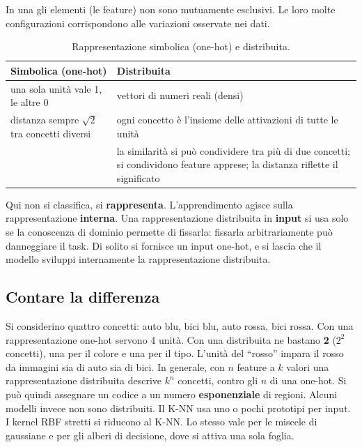 \begin{definizione}
In una  gli elementi (le feature) non sono mutuamente esclusivi. Le loro molte
configurazioni corrispondono alle variazioni osservate nei dati.
\end{definizione}

\begin{table}[ht]
\centering\small
\caption{Rappresentazione simbolica (one-hot) e distribuita.}
\begin{tabularx}{0.95\linewidth}{XX}
\toprule
Simbolica (one-hot) & Distribuita \\
\midrule
una sola unità vale 1, le altre 0 & vettori di numeri reali (densi) \\
distanza sempre $\sqrt2$ tra concetti diversi & ogni concetto è l'insieme delle attivazioni di tutte le unità \\
 & la similarità si può condividere tra più di due concetti; si condividono feature apprese; la distanza riflette il significato \\
\bottomrule
\end{tabularx}
\end{table}

Qui non si classifica, si \textbf{rappresenta}. L'apprendimento agisce sulla rappresentazione \textbf{interna}. Una
rappresentazione distribuita in \textbf{input} si usa solo se la conoscenza di dominio permette di fissarla:
fissarla arbitrariamente può danneggiare il task. Di solito si fornisce un input one-hot, e si lascia che il
modello sviluppi internamente la rappresentazione distribuita.

\subsection{Contare la differenza}

Si considerino quattro concetti: auto blu, bici blu, auto rossa, bici rossa. Con una rappresentazione one-hot
servono 4 unità. Con una distribuita ne bastano \textbf{2} ($2^2$ concetti), una per il colore e una per il tipo.
L'unità del ``rosso'' impara il rosso da immagini sia di auto sia di bici. In generale, con $n$ feature a $k$
valori una rappresentazione distribuita descrive $k^n$ concetti, contro gli $n$ di una one-hot. Si può quindi
assegnare un codice a un numero \textbf{esponenziale} di regioni. Alcuni modelli invece non sono distribuiti. Il
K-NN usa uno o pochi prototipi per input. I kernel RBF stretti si riducono al K-NN. Lo stesso vale per le miscele
di gaussiane e per gli alberi di decisione, dove si attiva una sola foglia.


